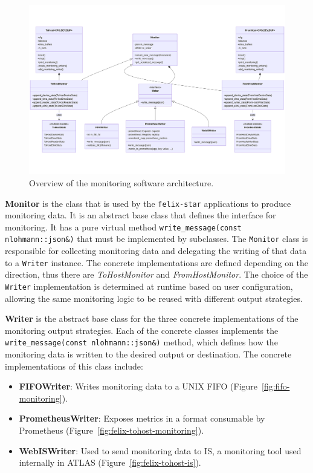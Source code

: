 \begin{figure}[htbp]
\centering
\includegraphics[width=\textwidth]{images/contributions/monitoring-uml.png}
\caption{Overview of the monitoring software architecture.}
\label{fig:monitoring-software-architecture}
\end{figure}

\textbf{Monitor} is the class that is used by the \texttt{felix-star} applications to produce monitoring data. It is an abstract base class that defines the interface for monitoring. It has a pure virtual method \texttt{write\_message(const nlohmann::json\&)} that must be implemented by subclasses. The \texttt{Monitor} class is responsible for collecting monitoring data and delegating the writing of that data to a \texttt{Writer} instance. The concrete implementations are defined depending on the direction, thus there are \emph{ToHostMonitor} and \emph{FromHostMonitor}. The choice of the \texttt{Writer} implementation is determined at runtime based on user configuration, allowing the same monitoring logic to be reused with different output strategies.

\textbf{Writer} is the abstract base class for the three concrete implementations of the monitoring output strategies. Each of the concrete classes implements the \texttt{write\_message(const nlohmann::json\&)} method, which defines how the monitoring data is written to the desired output or destination. The concrete implementations of this class include:

\begin{itemize}
    \item \textbf{FIFOWriter}: Writes monitoring data to a UNIX FIFO (Figure~\ref{fig:fifo-monitoring}).
    \item \textbf{PrometheusWriter}: Exposes metrics in a format consumable by Prometheus (Figure~\ref{fig:felix-tohost-monitoring}).
    \item \textbf{WebISWriter}: Used to send monitoring data to \acs{IS}, a monitoring tool used internally in \acs{ATLAS} (Figure~\ref{fig:felix-tohost-is}).
\end{itemize}

